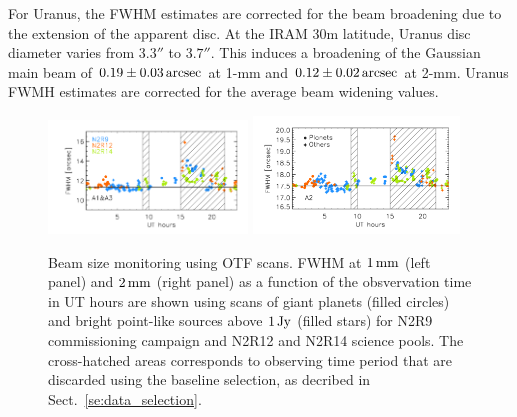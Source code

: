 
For Uranus, the FWHM estimates are corrected for the beam broadening due
to the extension of the apparent disc. At the IRAM 30m latitude,
Uranus disc diameter varies from $3.3''$ to $3.7''$. This induces a
broadening of the Gaussian main beam of $0.19 \pm 0.03\,\rm{arcsec}$ at
1-mm and $0.12 \pm 0.02\,\rm{arcsec}$ at 2-mm. Uranus FWMH estimates are
corrected for the average beam widening values. 

\begin{figure}[ht!]
  \begin{center}
    \includegraphics[clip=true, trim={0.9cm, 0.5cm, 0.5cm, 0.5cm}, width=0.4725\textwidth]{Figures/Beams/Beam_monitoring_with_otfs_vs_ut_1mm.pdf}
    \includegraphics[clip=true, trim={0.5cm, 0.5cm, 0.5cm, 0.5cm}, width=0.4875\textwidth]{Figures/Beams/Beam_monitoring_with_otfs_vs_ut_a2.pdf}
    \caption[Beam size monitoring using OTF scans]{Beam size
      monitoring using OTF scans. FWHM at $1\,\rm{mm}$ (left panel)
      and $2\,\rm{mm}$ (right panel) as a function of the
      obsvervation time in UT hours are shown using scans of giant
      planets (filled circles) and bright point-like sources above
      $1\,\rm{Jy}$ (filled stars) for N2R9 commissioning campaign and
      N2R12 and N2R14 science pools. The cross-hatched areas
      corresponds to observing time period that are discarded using
      the baseline selection, as decribed in Sect.~\ref{se:data_selection}.} 
\label{fig:beam_monitoring_otf}
  \end{center}
\end{figure}

